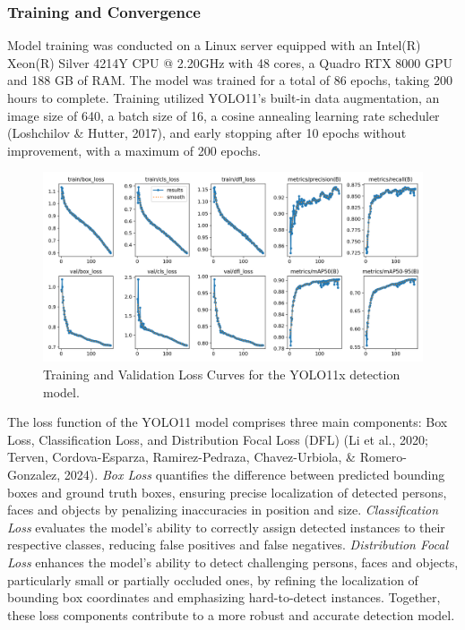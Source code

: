 \documentclass[
  man,floatsintext]{apa6}
\begin{document}
\subsubsection{Training and Convergence}\label{training-and-convergence}

Model training was conducted on a Linux server equipped with an Intel(R) Xeon(R) Silver 4214Y CPU @ 2.20GHz with 48 cores, a Quadro RTX 8000 GPU and 188 GB of RAM. The model was trained for a total of 86 epochs, taking 200 hours to complete. Training utilized YOLO11's built-in data augmentation, an image size of 640, a batch size of 16, a cosine annealing learning rate scheduler (Loshchilov \& Hutter, 2017), and early stopping after 10 epochs without improvement, with a maximum of 200 epochs.

\begin{figure}

{\centering \includegraphics[width=450px]{images/yolo_face_loss_curves} 

}

\caption{Training and Validation Loss Curves for the YOLO11x detection model.}\label{fig:det-loss-curves}
\end{figure}

The loss function of the YOLO11 model comprises three main components: Box Loss, Classification Loss, and Distribution Focal Loss (DFL) (Li et al., 2020; Terven, Cordova-Esparza, Ramirez-Pedraza, Chavez-Urbiola, \& Romero-Gonzalez, 2024). \emph{Box Loss} quantifies the difference between predicted bounding boxes and ground truth boxes, ensuring precise localization of detected persons, faces and objects by penalizing inaccuracies in position and size. \emph{Classification Loss} evaluates the model's ability to correctly assign detected instances to their respective classes, reducing false positives and false negatives. \emph{Distribution Focal Loss} enhances the model's ability to detect challenging persons, faces and objects, particularly small or partially occluded ones, by refining the localization of bounding box coordinates and emphasizing hard-to-detect instances. Together, these loss components contribute to a more robust and accurate detection model.
\end{document}
